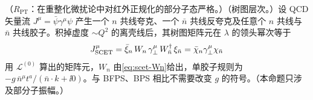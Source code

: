 \begin{proposition}\label{prop:scet-wilson}
（$R_{\mathrm{PT}}$：在重整化微扰论中对红外正规化的部分子态严格。）（树图层次。）设 QCD 矢量流 $J^\mu=\bar\psi\gamma^\mu\psi$ 产生一个 $n$ 共线夸克、一个 $\bar n$ 共线反夸克及任意个 $n$ 共线与 $\bar n$ 共线胶子。积掉虚度 $\sim Q^2$ 的离壳线后，其树图矩阵元在 $\lambda$ 的领头幂次等于
\begin{equation}\label{eq:scet-Jtree}
J^\mu_{\rm SCET}=\bar\xi_n\,W_n\,\gamma_\perp^\mu\,W_{\bar n}^\dagger\,\xi_{\bar n}=\bar\chi_n\gamma_\perp^\mu\chi_{\bar n}
\end{equation}
用 $\mathcal L^{(0)}$ 算出的矩阵元，$W_n$ 由\cref{eq:scet-Wn}给出，单胶子规则为 $-g\,\bar n^\mu t^a/(\bar n\cdot k+\ii0)$。与 BFPS、BPS 相比不需要改变 $g$ 的符号。（本命题只涉及部分子振幅。）
\end{proposition}

